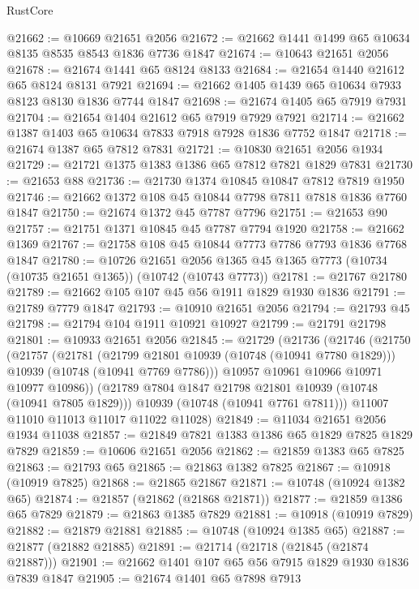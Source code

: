 \begin{lexlean}{RustCore}
\begin{coremodule}
@21662 := @10669 @21651 @2056
@21672 := @21662 @1441 @1499 @65 @10634 @8135 @8535 @8543 @1836 @7736 @1847
@21674 := @10643 @21651 @2056
@21678 := @21674 @1441 @65 @8124 @8133
@21684 := @21654 @1440 @21612 @65 @8124 @8131 @7921
@21694 := @21662 @1405 @1439 @65 @10634 @7933 @8123 @8130 @1836 @7744 @1847
@21698 := @21674 @1405 @65 @7919 @7931
@21704 := @21654 @1404 @21612 @65 @7919 @7929 @7921
@21714 := @21662 @1387 @1403 @65 @10634 @7833 @7918 @7928 @1836 @7752 @1847
@21718 := @21674 @1387 @65 @7812 @7831
@21721 := @10830 @21651 @2056 @1934
@21729 := @21721 @1375 @1383 @1386 @65 @7812 @7821 @1829 @7831
@21730 := @21653 @88
@21736 := @21730 @1374 @10845 @10847 @7812 @7819 @1950
@21746 := @21662 @1372 @108 @45 @10844 @7798 @7811 @7818 @1836 @7760 @1847
@21750 := @21674 @1372 @45 @7787 @7796
@21751 := @21653 @90
@21757 := @21751 @1371 @10845 @45 @7787 @7794 @1920
@21758 := @21662 @1369
@21767 := @21758 @108 @45 @10844 @7773 @7786 @7793 @1836 @7768 @1847
@21780 := @10726
    @21651
    @2056
    @1365
    @45
    @1365
    @7773
    (@10734 (@10735 @21651 @1365))
    (@10742 (@10743 @7773))
@21781 := @21767 @21780
@21789 := @21662 @105 @107 @45 @56 @1911 @1829 @1930 @1836
@21791 := @21789 @7779 @1847
@21793 := @10910 @21651 @2056
@21794 := @21793 @45
@21798 := @21794 @104 @1911 @10921 @10927
@21799 := @21791 @21798
@21801 := @10933 @21651 @2056
@21845 := @21729
    (@21736
      (@21746
        (@21750
          (@21757
            (@21781
              (@21799 @21801 @10939 (@10748 (@10941 @7780 @1829)))
              @10939
              (@10748 (@10941 @7769 @7786)))
            @10957
            @10961
            @10966
            @10971
            @10977
            @10986))
        (@21789 @7804 @1847 @21798 @21801 @10939 (@10748 (@10941 @7805 @1829)))
        @10939
        (@10748 (@10941 @7761 @7811)))
      @11007
      @11010
      @11013
      @11017
      @11022
      @11028)
@21849 := @11034 @21651 @2056 @1934 @11038
@21857 := @21849 @7821 @1383 @1386 @65 @1829 @7825 @1829 @7829
@21859 := @10606 @21651 @2056
@21862 := @21859 @1383 @65 @7825
@21863 := @21793 @65
@21865 := @21863 @1382 @7825
@21867 := @10918 (@10919 @7825)
@21868 := @21865 @21867
@21871 := @10748 (@10924 @1382 @65)
@21874 := @21857 (@21862 (@21868 @21871))
@21877 := @21859 @1386 @65 @7829
@21879 := @21863 @1385 @7829
@21881 := @10918 (@10919 @7829)
@21882 := @21879 @21881
@21885 := @10748 (@10924 @1385 @65)
@21887 := @21877 (@21882 @21885)
@21891 := @21714 (@21718 (@21845 (@21874 @21887)))
@21901 := @21662 @1401 @107 @65 @56 @7915 @1829 @1930 @1836 @7839 @1847
@21905 := @21674 @1401 @65 @7898 @7913

\end{coremodule}
\end{lexlean}
